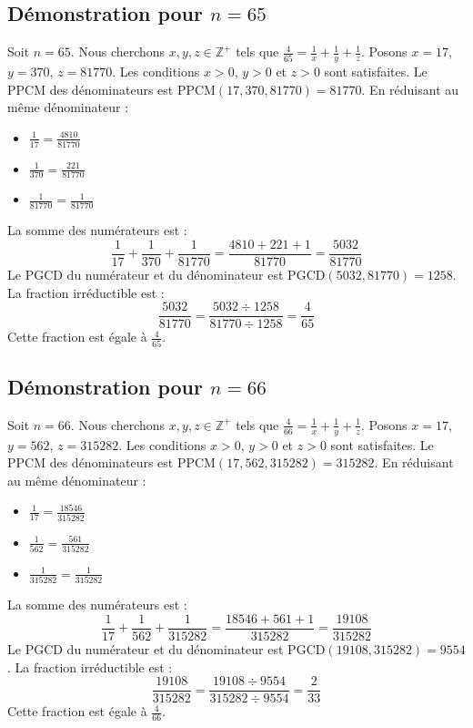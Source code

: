 \documentclass[11pt,a4paper]{article}
\begin{document}
\subsection{Démonstration pour $n = 65$}
Soit $n = 65$. Nous cherchons $x, y, z \in \mathbb{Z}^{+}$ tels que $\frac{4}{65} = \frac{1}{x} + \frac{1}{y} + \frac{1}{z}$.
Posons $x = 17$, $y = 370$, $z = 81770$.
Les conditions $x > 0$, $y > 0$ et $z > 0$ sont satisfaites.
Le PPCM des dénominateurs est $\text{PPCM}(17, 370, 81770) = 81770$.
En réduisant au même dénominateur :
\begin{itemize}
    \item $\frac{1}{17} = \frac{4810}{81770}$
    \item $\frac{1}{370} = \frac{221}{81770}$
    \item $\frac{1}{81770} = \frac{1}{81770}$
\end{itemize}
La somme des numérateurs est :
$$ \frac{1}{17} + \frac{1}{370} + \frac{1}{81770} = \frac{4810 + 221 + 1}{81770} = \frac{5032}{81770} $$
Le PGCD du numérateur et du dénominateur est $\text{PGCD}(5032, 81770) = 1258$.
La fraction irréductible est :
$$ \frac{5032}{81770} = \frac{5032 \div 1258}{81770 \div 1258} = \frac{4}{65} $$
Cette fraction est égale à $\frac{4}{65}$.

\subsection{Démonstration pour $n = 66$}
Soit $n = 66$. Nous cherchons $x, y, z \in \mathbb{Z}^{+}$ tels que $\frac{4}{66} = \frac{1}{x} + \frac{1}{y} + \frac{1}{z}$.
Posons $x = 17$, $y = 562$, $z = 315282$.
Les conditions $x > 0$, $y > 0$ et $z > 0$ sont satisfaites.
Le PPCM des dénominateurs est $\text{PPCM}(17, 562, 315282) = 315282$.
En réduisant au même dénominateur :
\begin{itemize}
    \item $\frac{1}{17} = \frac{18546}{315282}$
    \item $\frac{1}{562} = \frac{561}{315282}$
    \item $\frac{1}{315282} = \frac{1}{315282}$
\end{itemize}
La somme des numérateurs est :
$$ \frac{1}{17} + \frac{1}{562} + \frac{1}{315282} = \frac{18546 + 561 + 1}{315282} = \frac{19108}{315282} $$
Le PGCD du numérateur et du dénominateur est $\text{PGCD}(19108, 315282) = 9554$.
La fraction irréductible est :
$$ \frac{19108}{315282} = \frac{19108 \div 9554}{315282 \div 9554} = \frac{2}{33} $$
Cette fraction est égale à $\frac{4}{66}$.
\end{document}
